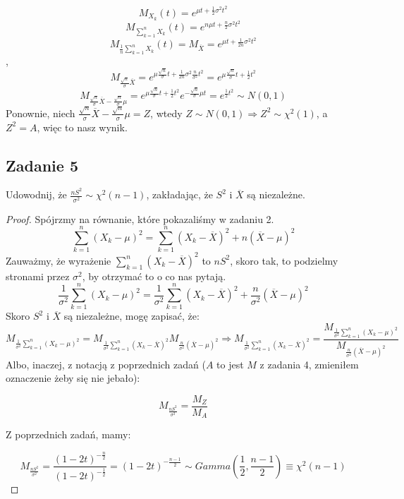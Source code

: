 \documentclass[a4paper]{article}
\begin{document}
$$M_{X_k}(t)=e^{\mu t + \frac{1}{2}\sigma^2t^2}$$
$$M_{\sum\limits_{k=1}^n X_k}(t)=e^{n\mu t + \frac{n}{2}\sigma^2t^2}$$
$$M_{\frac{1}{n}\sum\limits_{k=1}^n X_k}(t)=M_{\overline{X}}=e^{\mu t + \frac{1}{2n}\sigma^2t^2}$$, 
$$M_{\frac{\sqrt{n}}{\sigma}\overline{X}} = e^{\mu \frac{\sqrt{n}}{\sigma}t + \frac{1}{2n}\sigma^2\frac{n}{\sigma^2}t^2} = e^{\mu \frac{\sqrt{n}}{\sigma}t + \frac{1}{2}t^2}$$
$$M_{\frac{\sqrt{n}}{\sigma}\overline{X} - \frac{\sqrt{n}}{\sigma}\mu} = e^{\mu \frac{\sqrt{n}}{\sigma}t + \frac{1}{2}t^2}e^{-\frac{\sqrt{n}}{\sigma}\mu t} = e^{\frac{1}{2}t^2} \sim N(0,1)$$ 
Ponownie, niech $\frac{\sqrt{n}}{\sigma}\overline{X} - \frac{\sqrt{n}}{\sigma}\mu = Z$, wtedy $Z\sim N(0,1) \Rightarrow Z^2 \sim \chi^2(1)$, a $Z^2=A$, więc to nasz wynik.

\subsection*{Zadanie 5}
Udowodnij, że $\frac{nS^2}{\sigma^2} \sim \chi^2(n-1)$, zakładając, że $S^2$ i $\overline{X}$ są niezależne.

\begin{proof}
Spójrzmy na równanie, które pokazaliśmy w zadaniu 2.
$$\sum\limits_{k=1}^n (X_k - \mu)^2 = \sum\limits_{k=1}^n (X_k-\overline{X})^2 + n(\overline{X}-\mu)^2$$
Zauważmy, że wyrażenie $\sum\limits_{k=1}^n (X_k-\overline{X})^2$ to $nS^2$, skoro tak, to podzielmy stronami przez $\sigma^2$, by otrzymać to o co nas pytają.
$$\frac{1}{{\sigma}^2}\sum\limits_{k=1}^n \left(X_k - \mu\right)^2 = \frac{1}{\sigma^2}\sum\limits_{k=1}^n \left(X_k-\overline{X}\right)^2 + \frac{n}{\sigma^2}\left(\overline{X}-\mu\right)^2$$
Skoro $S^2$ i $\overline{X}$ są niezależne, mogę zapisać, że:
$$M_{\frac{1}{{\sigma}^2}\sum\limits_{k=1}^n \left(X_k - \mu\right)^2}=M_{\frac{1}{\sigma^2}\sum\limits_{k=1}^n \left(X_k-\overline{X}\right)^2}M_{\frac{n}{\sigma^2}\left(\overline{X}-\mu\right)^2} \Rightarrow M_{\frac{1}{\sigma^2}\sum\limits_{k=1}^n \left(X_k-\overline{X}\right)^2} = \frac{M_{\frac{1}{{\sigma}^2}\sum\limits_{k=1}^n \left(X_k - \mu\right)^2}}{M_{\frac{n}{\sigma^2}\left(\overline{X}-\mu\right)^2}}$$
Albo, inaczej, z notacją z poprzednich zadań ($A$ to jest $M$ z zadania 4, zmieniłem oznaczenie żeby się nie jebało):

$$M_{\frac{nS^2}{\sigma^2}} = \frac{M_Z}{M_A}$$

Z poprzednich zadań, mamy:

$$M_{\frac{nS^2}{\sigma^2}} = \frac{(1-2t)^{-\frac{n}{2}}}{(1-2t)^{-\frac{1}{2}}}=(1-2t)^{-\frac{n-1}{2}} \sim Gamma(\frac{1}{2},\frac{n-1}{2}) \equiv \chi^2(n-1) $$
\end{proof}
\end{document}
